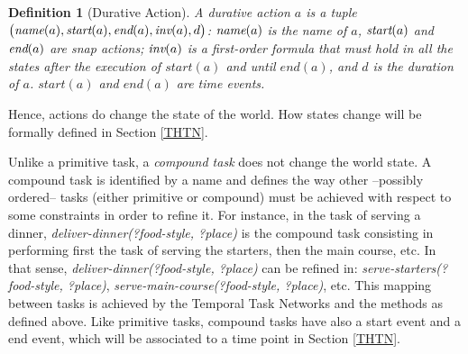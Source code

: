 \documentclass[letterpaper]{article} %
\newtheorem{definition}{Definition}
\newcommand{\name}{\text{\it name}}
\newcommand{\tstart}{\text{\it start}}
\newcommand{\tend}{\text{\it end}}
\newcommand{\tinv}{\text{\it inv}}
\begin{document}
\begin{definition}[Durative Action]
A {\em durative action} $a$ is a tuple $\bigl(\name(a), \tstart(a), \tend(a), \tinv(a), d\bigr)$: $\name(a)$ is the name of $a$, $\tstart(a)$ and $\tend(a)$ are snap actions; $\tinv(a)$ is a first-order formula that must hold in all the states after the execution of $start(a)$ and until $end(a)$, and $d$ is the duration of $a$. $start(a)$ and $end(a)$ are time events.
\end{definition}
Hence, actions do change the state of the world. How states change will be formally defined in Section \ref{THTN}.

Unlike a primitive task, %
a {\it compound task} does not change the world state.
A compound task is identified by a name and defines the way other --possibly ordered-- tasks (either primitive or compound) must be achieved with respect to some constraints in order to refine it.
For instance, in the task of serving a dinner, {\it deliver-dinner(?food-style, ?place)} is the compound task consisting in performing first the task of serving the starters, then the main course, etc. In that sense,  {\it deliver-dinner(?food-style, ?place)} can be refined in: {\it serve-starters(?food-style, ?place)},  {\it serve-main-course(?food-style, ?place)}, etc. This mapping between tasks is achieved by the Temporal Task Networks and the methods as defined above. Like primitive tasks, compound tasks have also a start event and a end event, which will be associated to a time point in Section \ref{THTN}.
\end{document}
